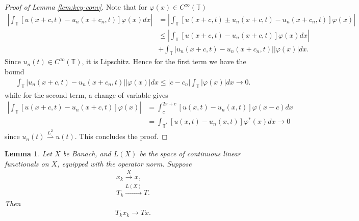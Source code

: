 \documentclass[12pt,reqno]{amsart}
\numberwithin{equation}{section}  %
\newcommand{\ci}{\mathbb{T}}
\newcommand{\vp}{\varphi}
\newtheorem{lemma}[theorem]{Lemma}
\begin{document}
%
%
%
\begin{proof}[Proof of Lemma \ref{lem:key-conv}]
  Note that for $\vp (x)\in C^{\infty}(\ci)$
%
%
\begin{equation}
  \label{gfh}
\begin{split}
  | \int_{\ci} \left[ u(x+c, t) - u_{n}(x + c_{n}, t) \right] \vp(x) dx |
  & = | \int_{\ci} \left[ u(x +c, t) \pm u_{n}(x+c, t) - u_{n}(x + c_{n}, t)
  \right] \vp(x) |
  \\
  & \le | \int_{\ci} [ u(x +c, t) - u_{n}(x +c, t) ] \vp(x) dx |
  \\
  & + \int_{\ci} | u_{n}(x +c, t) - u_{n}(x +c_{n}, t) | | \vp(x) | dx.
\end{split}
\end{equation}
%
%
Since $u_{n}(t) \in C^{\infty}(\ci)$, it is Lipschitz. Hence for the first term
we have the bound
%
%
\begin{equation*}
\begin{split}
  \int_{\ci} | u_{n}(x +c, t) - u_{n}(x + c_{n}, t) | | \vp(x) | dx
  \le | c -c_{n} | \int_{\ci} | \vp(x) | dx \to 0.
\end{split}
\end{equation*}
%
%
while for the second term, a change of variable gives
%
%
\begin{equation*}
\begin{split}
   | \int_{\ci} \left[ u(x +c, t) - u_{n}(x +c, t) \right] \vp(x) | 
   & = \int_{c}^{2 \pi +c} \left[ u(x,t) - u_{n}(x,t) \right] \vp(x-c) dx
   \\
   & = \int_{\ci^{*}} \left[ u(x,t) - u_{n}(x,t) \right] \vp^{*}(x) dx \to 0
\end{split}
\end{equation*}
%
%
since $u_{n}(t) \overset{L^{2}}{\rightharpoonup} u(t)$. This concludes the proof.
\end{proof}
%
%
%
%
%
\begin{lemma}
Let $X$ be Banach, and $L(X)$ be the space of continuous linear functionals on
$X$, equipped with the operator norm. Suppose 
%
%
\begin{gather*}
  x_{k} \xrightarrow{X} x,
  \\
  T_{k} \xrightarrow{L(X)} T.
\end{gather*}
%
%
Then
\begin{gather*}
  T_{k} x_{k} \to Tx.
\end{gather*}
%
\label{lem:diag}
\end{lemma}
\end{document}
